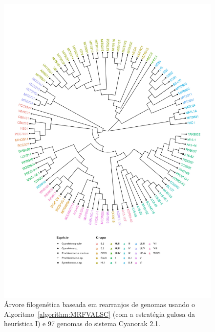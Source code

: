 \begin{figure}[!htb]
    \centering
    \includegraphics[width=.95\textwidth]{figures/REHDYXMS}
    \caption{Árvore filogenética baseada em rearranjos de genomas usando o Algoritmo~\ref{algorithm:MRFVALSC} (com a estratégia gulosa da heurística I) e 97 genomas do sistema Cyanorak 2.1.} 
    \label{figure:REHDYXMS}
\end{figure}